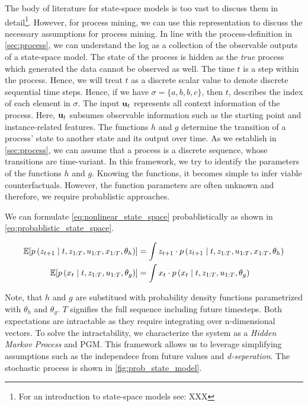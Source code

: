 \documentclass[./../../paper.tex]{subfiles}
\begin{document}
The body of literature for state-space models is too vast to discuss them in detail\footnote{For an introduction to state-space models see: XXX}. However, for process mining, we can use this representation to discuss the necessary assumptions for process mining.
In line with the process-definition in \autoref{sec:process}, we can understand the \gls{log} as a collection of the observable outputs of a state-space model. 
The state of the process is hidden as the \emph{true} process which generated the data cannot be observed as well. The time $t$ is a step within the process. Hence, we will treat $t$ as a discrete scalar value to denote discrete sequential time steps. Hence, if we have $\sigma=\{a,b,b,c\}$, then $t$, describes the index of each element in $\sigma$.  The input $\mathbf{u}_t$ represents all context information of the process. Here, $\mathbf{u}_t$ subsumes observable information such as the starting point and \gls{instance}-related features. The functions $h$ and $g$ determine the transition of a process' state to another state and its output over time. 
As we establish in \autoref{sec:process}, we can assume that a process is a discrete sequence, whose transitions are time-variant. 
In this framework, we try to identify the parameters of the functions $h$ and $g$. Knowing the functions, it becomes simple to infer viable counterfactuals. However, the function parameters are often unknown and therefore, we require probablistic approaches.

We can formulate \autoref{eq:nonlinear_state_space} probablistically as shown in \autoref{eq:probablistic_state_space}.

\begin{align}
    \label{eq:probablistic_state_space}
    \mathbb{E}[p\left(z_{t+1} \mid t, z_{1:T}, u_{1:T}, x_{1:T}, \theta_h\right)] & =
    \int z_{t+1} \cdot p\left(z_{t+1} \mid t, z_{1:T}, u_{1:T}, x_{1:T}, \theta_h\right) \\
    \mathbb{E}[p\left(x_t \mid t, z_{1:T}, u_{1:T}, \theta_g\right)]   & =
    \int x_{t} \cdot p\left(x_t \mid t, z_{1:T}, u_{1:T}, \theta_g\right) \nonumber
\end{align}

Note, that $h$ and $g$ are substitued with probability density functions parametrized with $\theta_h$ and $\theta_g$. $T$ signifies the full sequence including future timesteps.
Both expectations are intractable as they require integrating over n-dimensional vectors. To solve the intractability, we characterize the system as a \emph{Hidden Markov Process} and \gls{PGM}. This framework allows us to leverage simplifying assumptions such as the independece from future values and \emph{d-seperation}. The stochastic process is shown in \autoref{fig:prob_state_model}.
\end{document}
